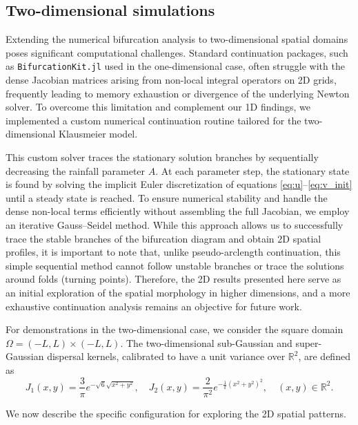 \documentclass[11pt, a4paper]{article}
\theoremstyle{break}
\theoremstyle{break}
\theoremstyle{break}
\theoremstyle{break}
\theoremstyle{break}
\theoremstyle{break}
\theoremstyle{break}
\theoremstyle{break}
\theoremstyle{break}
\theoremstyle{break}
\begin{document}
\subsection{Two-dimensional simulations}

Extending the numerical bifurcation analysis to two-dimensional spatial domains poses significant computational challenges. Standard continuation packages, such as \texttt{BifurcationKit.jl} used in the one-dimensional case, often struggle with the dense Jacobian matrices arising from non-local integral operators on 2D grids, frequently leading to memory exhaustion or divergence of the underlying Newton solver. To overcome this limitation and complement our 1D findings, we implemented a custom numerical continuation routine tailored for the two-dimensional Klausmeier model.

This custom solver traces the stationary solution branches by sequentially decreasing the rainfall parameter $A$. At each parameter step, the stationary state is found by solving the implicit Euler discretization of equations \eqref{eq:u}--\eqref{eq:v_init} until a steady state is reached. To ensure numerical stability and handle the dense non-local terms efficiently without assembling the full Jacobian, we employ an iterative Gauss--Seidel method. While this approach allows us to successfully trace the stable branches of the bifurcation diagram and obtain 2D spatial profiles, it is important to note that, unlike pseudo-arclength continuation, this simple sequential method cannot follow unstable branches or trace the solutions around folds (turning points). Therefore, the 2D results presented here serve as an initial exploration of the spatial morphology in higher dimensions, and a more exhaustive continuation analysis remains an objective for future work.

For demonstrations in the two-dimensional case, we consider the square domain $\Omega = (-L, L) \times (-L, L)$. The two-dimensional sub-Gaussian and super-Gaussian dispersal kernels, calibrated to have a unit variance over $\mathbb{R}^2$, are defined as
\begin{equation}
    \label{eq:2dGaussian_PDF}
    J_1(x, y) = \frac{3}{\pi} e^{-\sqrt{6}\sqrt{x^2+y^2}}, \quad
    J_2(x, y) = \frac{2}{\pi^2} e^{-\frac{1}{\pi} (x^2+y^2)^2}, \quad (x,y) \in \mathbb{R}^2.
\end{equation}

We now describe the specific configuration for exploring the 2D spatial patterns.
\end{document}
